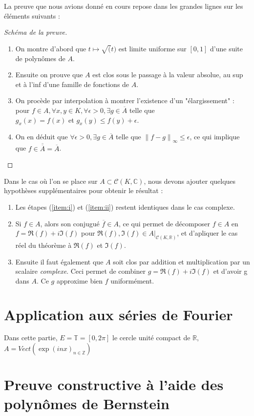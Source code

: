 \documentclass{amsart}
\begin{document}
\par La preuve que nous avions donné en cours repose dans les grandes lignes sur les éléments suivants :

\begin{proof}[Schéma de la preuve]
	\begin{enumerate}[label = (\roman*), ref=\roman*]
		\item On montre d'abord que \( t \mapsto \sqrt(t) \) est limite uniforme sur \( [0,1] \) d'une suite de polynômes de \( A \). \label{item:i}
		\item Ensuite on prouve que \( A \) est clos sous le passage à la valeur absolue, au sup et à l'inf d'une famille de fonctions de \( A \). \label{item:ii}
		\item On procède par interpolation à montrer l'existence d'un "élargissement" : pour \( f \in A, \forall x,y \in K, \forall \epsilon > 0, \exists g \in \overline{A} \) telle que \\\( g_{x}(x) = f(x) \) et \( g_{x}(y) \leq f(y) + \epsilon \). \label{item:iii}
		\item On en déduit que \( \forall\epsilon > 0, \exists g \in \overline{A} \) telle que \( {\left\lVert f-g \right\rVert_{\infty}} \le \epsilon \), ce qui implique que \( f \in \overline{\overline{A}} = \overline{A} \). \label{item:iv}
	\end{enumerate}	
\end{proof}

\par Dans le cas où l'on se place sur \( A \subset \mathcal{C}(K,\mathbb{C}) \), nous devons ajouter quelques hypothèses supplémentaires pour obtenir le résultat : 
\begin{enumerate}
	\item Les étapes (\ref{item:i}) et (\ref{item:ii}) restent identiques dans le cas complexe. 
	\item Si \( f \in A \), alors son conjugué \( \overline{f} \in A \), 
		ce qui permet de décomposer \( f \in A \) en \( f = \Re(f) + i\Im(f) \) 
		pour \( \Re(f), \Im(f) \in A|_{\mathcal{C}(K,\mathbb{R})} \), 
		et d'apliquer le cas réel du théorème à \( \Re(f) \) et \( \Im(f) \).
	\item Ensuite il faut également que \( A \) soit clos par addition et multiplication par un scalaire \textit{complexe}. Ceci permet de combiner \( g = \Re(f) + i\Im(f) \) 
		et d'avoir g dans \( A \). Ce \( g \) approxime bien \( f \) uniformément.


\end{enumerate}



\section{Application aux séries de Fourier}

\par Dans cette partie, \( E = \mathbb{T} = [0,2\pi] \) le cercle unité compact de \( \mathbb{R} \), \( A = Vect({\exp(inx)_{n \in \mathbb{Z}}}) \)

\section{Preuve constructive à l'aide des polynômes de Bernstein}

\clearpage
\printbibliography
\end{document}
